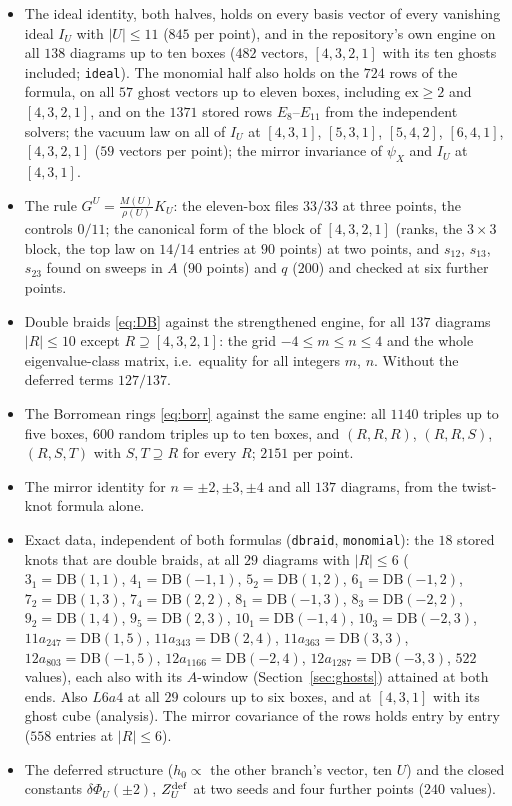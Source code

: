 \documentclass[11pt]{article}
\newcommand{\LMPH}[1]{\texttt{#1}}
\begin{document}
\begin{itemize}
\item The ideal identity, both halves, holds on every basis vector of every vanishing ideal $I_U$ with $|U|\le11$ ($845$
per point), and in the repository's own engine on all $138$ diagrams up to ten boxes ($482$ vectors, $[4,3,2,1]$ with its
ten ghosts included; \LMPH{ideal}).  The monomial half also holds on the $724$ rows of the formula, on all $57$ ghost
vectors up to eleven boxes, including $\mathrm{ex}\ge2$ and $[4,3,2,1]$, and on the $1371$ stored rows $E_8$--$E_{11}$
from the independent solvers; the vacuum law on all of $I_U$ at $[4,3,1]$, $[5,3,1]$, $[5,4,2]$, $[6,4,1]$, $[4,3,2,1]$
($59$ vectors per point); the mirror invariance of $\psi_X$ and $I_U$ at $[4,3,1]$.
\item The rule $G^U=\frac{M(U)}{\rho(U)}K_U$: the eleven-box files $33/33$ at three points, the controls $0/11$; the
canonical form of the block of $[4,3,2,1]$ (ranks, the $3\times3$ block, the top law on $14/14$ entries at $90$ points)
at two points, and $s_{12}$, $s_{13}$, $s_{23}$ found on sweeps in $A$ ($90$ points) and $q$ ($200$) and checked at six
further points.
\item Double braids \eqref{eq:DB} against the strengthened engine, for all $137$ diagrams $|R|\le10$ except
$R\supseteq[4,3,2,1]$: the grid $-4\le m\le n\le4$ and the whole eigenvalue-class matrix, i.e.\ equality for all integers
$m$, $n$.  Without the deferred terms $127/137$.
\item The Borromean rings \eqref{eq:borr} against the same engine: all $1140$ triples up to five boxes, $600$ random
triples up to ten boxes, and $(R,R,R)$, $(R,R,S)$, $(R,S,T)$ with $S,T\supseteq R$ for every $R$; $2151$ per point.
\item The mirror identity for $n=\pm2,\pm3,\pm4$ and all $137$ diagrams, from the twist-knot formula alone.
\item Exact data, independent of both formulas (\LMPH{dbraid}, \LMPH{monomial}): the $18$ stored knots that are double
braids, at all $29$ diagrams with $|R|\le6$ ($3_1=\mathrm{DB}(1,1)$, $4_1=\mathrm{DB}(-1,1)$, $5_2=\mathrm{DB}(1,2)$,
$6_1=\mathrm{DB}(-1,2)$, $7_2=\mathrm{DB}(1,3)$, $7_4=\mathrm{DB}(2,2)$, $8_1=\mathrm{DB}(-1,3)$, $8_3=\mathrm{DB}(-2,2)$,
$9_2=\mathrm{DB}(1,4)$, $9_5=\mathrm{DB}(2,3)$, $10_1=\mathrm{DB}(-1,4)$, $10_3=\mathrm{DB}(-2,3)$,
$11a_{247}=\mathrm{DB}(1,5)$, $11a_{343}=\mathrm{DB}(2,4)$, $11a_{363}=\mathrm{DB}(3,3)$, $12a_{803}=\mathrm{DB}(-1,5)$,
$12a_{1166}=\mathrm{DB}(-2,4)$, $12a_{1287}=\mathrm{DB}(-3,3)$, $522$ values), each also with its $A$-window
(Section~\ref{sec:ghosts}) attained at both ends.  Also $L6a4$ at all $29$ colours up to six boxes, and at $[4,3,1]$ with
its ghost cube (analysis).  The mirror covariance of the rows holds entry by entry ($558$
entries at $|R|\le6$).
\item The deferred structure ($h_0\propto$ the other branch's vector, ten $U$) and the closed constants $\delta\Phi_U(\pm2)$,
$Z^{\rm def}_U$ at two seeds and four further points ($240$ values).
\end{itemize}
\end{document}
